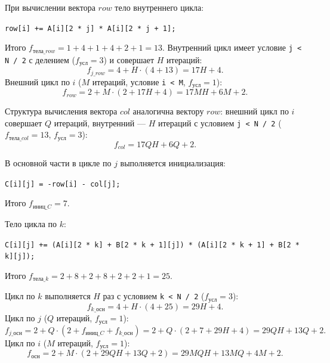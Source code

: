 При вычислении вектора $row$ тело внутреннего цикла:
\begin{center}
\texttt{row[i] += A[i][2 * j] * A[i][2 * j + 1];}
\end{center}
Итого $f_{\text{тела\_}row} = 1 + 4 + 1 + 4 + 2 + 1 = 13$. Внутренний цикл имеет условие \texttt{j < N / 2} с делением ($f_{\text{усл}} = 3$) и совершает $H$ итераций:
\begin{equation}
    f_{j\_row} = 4 + H \cdot (4 + 13) = 17H + 4.
\end{equation}
Внешний цикл по $i$ ($M$ итераций, условие \texttt{i < M}, $f_{\text{усл}} = 1$):
\begin{equation}
    f_{row} = 2 + M \cdot (2 + 17H + 4) = 17MH + 6M + 2.
\end{equation}

Структура вычисления вектора $col$ аналогична вектору $row$: внешний цикл по $i$ совершает $Q$ итераций, внутренний --- $H$ итераций с условием \texttt{j < N / 2} ($f_{\text{тела\_}col} = 13$, $f_{\text{усл}} = 3$):
\begin{equation}
    f_{col} = 17QH + 6Q + 2.
\end{equation}

В основной части в цикле по $j$ выполняется инициализация:
\begin{center}
\texttt{C[i][j] = -row[i] - col[j];}
\end{center}
Итого $f_{\text{иниц\_}C} = 7$.

Тело цикла по $k$:
\begin{center}
\texttt{C[i][j] += (A[i][2 * k] + B[2 * k + 1][j]) * (A[i][2 * k + 1] + B[2 * k][j]);}
\end{center}
Итого $f_{\text{тела\_}k} = 2 + 8 + 2 + 8 + 2 + 2 + 1 = 25$.

Цикл по $k$ выполняется $H$ раз с условием \texttt{k < N / 2} ($f_{\text{усл}} = 3$):
\begin{equation}
    f_{k\_\text{осн}} = 4 + H \cdot (4 + 25) = 29H + 4.
\end{equation}
Цикл по $j$ ($Q$ итераций, $f_{\text{усл}} = 1$):
\begin{equation}
    f_{j\_\text{осн}} = 2 + Q \cdot (2 + f_{\text{иниц\_}C} + f_{k\_\text{осн}}) = 2 + Q \cdot (2 + 7 + 29H + 4) = 29QH + 13Q + 2.
\end{equation}
Цикл по $i$ ($M$ итераций, $f_{\text{усл}} = 1$):
\begin{equation}
    f_{\text{осн}} = 2 + M \cdot (2 + 29QH + 13Q + 2) = 29MQH + 13MQ + 4M + 2.
\end{equation}


